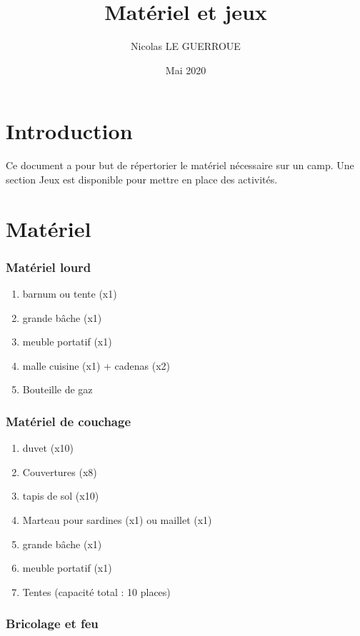 \documentclass{article}
\title{Matériel et jeux}
\author{Nicolas LE GUERROUE}
\date{Mai 2020}
\begin{document}
\maketitle
\tableofcontents
\newpage
\section{Introduction}
Ce document a pour but de répertorier le matériel nécessaire sur un camp.
Une section Jeux est disponible pour mettre en place des activités.
\newpage
\section{Matériel}

\subsubsection{Matériel lourd}
\begin{enumerate}
    \item barnum ou tente (x1)
    \item grande bâche (x1)
    \item meuble portatif (x1)
    \item malle cuisine (x1) + cadenas (x2)
    \item Bouteille de gaz
    
\end{enumerate}

\subsubsection{Matériel de couchage}
\begin{enumerate}
    \item duvet (x10)
    \item Couvertures (x8)
    \item tapis de sol (x10)
    \item Marteau pour sardines (x1) ou maillet (x1)
    \item grande bâche (x1)
    \item meuble portatif (x1)
    \item Tentes (capacité total : 10 places)
    
\end{enumerate}

\subsubsection{Bricolage et feu}
\end{document}

